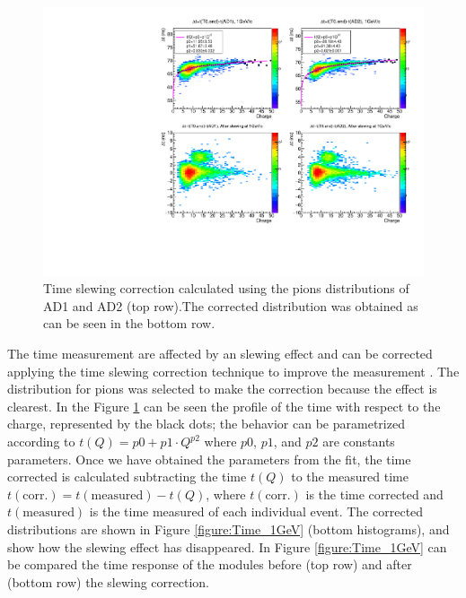 	\begin{figure}[h!]
	  \begin{center}
	\includegraphics[scale=0.60]{./images/time/1GeV/NoteSlewH2.pdf}%
	\caption{Time slewing correction calculated using the pions distributions of AD1 and AD2 (top row).The corrected distribution
	was obtained as can be seen in the bottom row.}
	\label{figure:TimeQSlew_1GeV}
	  \end{center}
	\end{figure}
	
	The time measurement are affected by
	an slewing effect and can be corrected applying the time slewing correction technique to improve the measurement \cite{V0Performance}. The distribution for pions was selected to make the correction because the
	effect is clearest. In the Figure \ref{figure:TimeQSlew_1GeV} can be seen the profile of the time with respect
	to the charge, represented by the black dots; the behavior can be parametrized according to 
	$t(Q)=p0+p1\cdot Q^{p2}$ where $p0$, $p1$, and $p2$ are constants parameters. Once we have obtained the parameters
	from the fit, the time corrected is calculated subtracting the time $t(Q)$ to the measured time 
	$ t(\textrm{corr.})=t(\textrm{measured})-t(Q)$, where $t(\textrm{corr.})$ is the time corrected and
	$t(\textrm{measured})$ is the time measured of each individual event. The corrected distributions are shown in Figure \ref{figure:Time_1GeV} (bottom histograms),  and show how the slewing effect has disappeared. In Figure
	\ref{figure:Time_1GeV} can be compared the time response of the modules before (top row) and after (bottom
	row) the slewing correction.%
	
